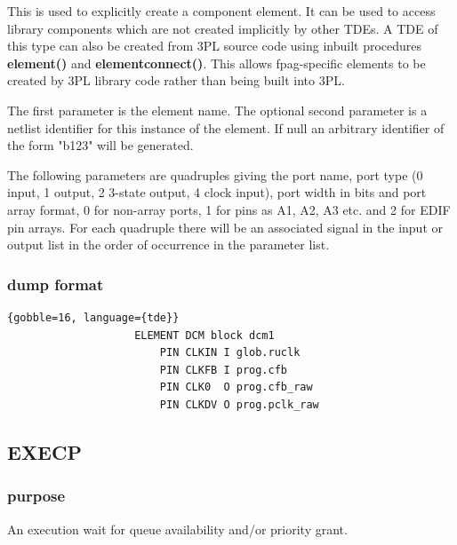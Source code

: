 \documentclass[10pt,a4paper,twoside,fleqn]{book}
\begin{document}
                This is used to explicitly create a component element. It can be
                used to access library components which are not created
                implicitly by other TDEs. A TDE of this type can also be
                created from 3PL source code using inbuilt procedures
                {\bf element()} and {\bf elementconnect()}. This allows
                fpag-specific elements to be created by 3PL library code
                rather than being built into 3PL.

                The first parameter is the element name. The optional second
                parameter is a netlist identifier for this instance of the
                element. If null an arbitrary identifier of the form "b123" will
                be generated.
                
                The following parameters are quadruples giving the port name,
                port type (0 input, 1 output, 2 3-state output, 4 clock input),
                port width in bits and port array format, 0 for non-array
                ports, 1 for pins as A1, A2, A3 etc. and 2 for EDIF pin arrays.
                For each quadruple there will be an associated signal in the
                input or output list in the order of occurrence in the
                parameter list.
            
            \subsubsection{dump format}
            
                \begin{lstlisting}{gobble=16, language={tde}}
                    ELEMENT DCM block dcm1
	                    PIN CLKIN I glob.ruclk
	                    PIN CLKFB I prog.cfb
	                    PIN CLK0  O prog.cfb_raw
	                    PIN CLKDV O prog.pclk_raw
                \end{lstlisting}


            \subsection{EXECP}

                \subsubsection{purpose}

                    An execution wait for queue availability and/or priority
                    grant.
\end{document}

